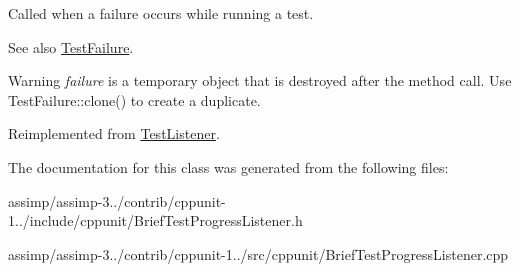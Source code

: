 Called when a failure occurs while running a test. 

\begin{DoxySeeAlso}{See also}
\hyperlink{class_test_failure}{Test\+Failure}. 
\end{DoxySeeAlso}
\begin{DoxyWarning}{Warning}
{\itshape failure} is a temporary object that is destroyed after the method call. Use Test\+Failure\+::clone() to create a duplicate. 
\end{DoxyWarning}


Reimplemented from \hyperlink{class_test_listener_a103216a5814c907f7b752b969477e765}{Test\+Listener}.



The documentation for this class was generated from the following files\+:\begin{DoxyCompactItemize}
\item 
assimp/assimp-\/3../contrib/cppunit-\/1../include/cppunit/Brief\+Test\+Progress\+Listener.\+h\item 
assimp/assimp-\/3../contrib/cppunit-\/1../src/cppunit/Brief\+Test\+Progress\+Listener.\+cpp\end{DoxyCompactItemize}
